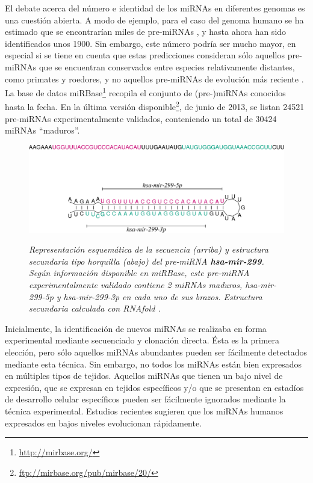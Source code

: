 \documentclass[12pt,bibliography=openstyle,DIV=12,parskip=full-]{scrartcl}
\begin{document}
El debate acerca del número e identidad de los miRNAs en diferentes
genomas es una cuestión abierta. A modo de ejemplo, para el caso del
genoma humano se ha estimado que se encontrarían miles de pre-miRNAs
\cite{batuwita}, y hasta ahora han sido identificados unos 1900.  Sin
embargo, este número podría ser mucho mayor, en especial si se tiene
en cuenta que estas predicciones consideran sólo aquellos pre-miRNAs
que se encuentran conservados entre especies relativamente distantes,
como primates y roedores, y no aquellos pre-miRNAs de evolución más
reciente \cite{sewer}.  La base de datos
miRBase\footnote{\url{http://mirbase.org/}}
\cite{mirbase2}\cite{mirbase3} recopila el conjunto de (pre-)miRNAs
conocidos hasta la fecha. En la última versión
disponible\footnote{\url{ftp://mirbase.org/pub/mirbase/20/}}, de junio
de 2013, se listan 24521 pre-miRNAs experimentalmente validados,
conteniendo un total de 30424 miRNAs ``maduros''.
%
\begin{figure}
  \small\slshape\center
  \includegraphics[width=.9\textwidth]{img/hsa-mir-299_ss.pdf}
  \caption{\small\slshape Representación esquemática de la secuencia (arriba) y
    estructura secundaria tipo horquilla (abajo) del pre-miRNA
    \textbf{hsa-mir-299}. Según información disponible en miRBase,
    este pre-miRNA experimentalmente validado contiene 2 miRNAs
    maduros, hsa-mir-299-5p y hsa-mir-299-3p en cada uno de sus
    brazos. Estructura secundaria calculada con RNAfold
    \cite{vienna}.}
  \label{horquilla}
\end{figure}

Inicialmente, la identificación de nuevos miRNAs se realizaba en forma
experimental mediante secuenciado y clonación directa. Ésta es la
primera elección, pero sólo aquellos miRNAs abundantes pueden ser
fácilmente detectados mediante esta técnica. Sin embargo,
no todos los miRNAs están bien expresados en múltiples tipos de
tejidos. Aquellos miRNAs que tienen un bajo nivel de expresión, que se
expresan en tejidos específicos y/o que se presentan en estadíos de
desarrollo celular específicos pueden ser fácilmente ignorados
mediante la técnica experimental. Estudios recientes sugieren que los
miRNAs humanos expresados en bajos niveles evolucionan
rápidamente. \cite{ding}\cite{xu}
\end{document}
